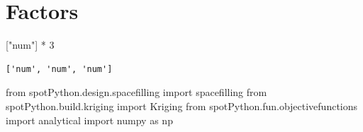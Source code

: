 \documentclass[
  letterpaper,
  DIV=11,
  numbers=noendperiod]{scrreprt}
\newenvironment{Shaded}{\begin{snugshade}}{\end{snugshade}}
\newcommand{\DecValTok}[1]{\textcolor[rgb]{0.68,0.00,0.00}{#1}}
\newcommand{\ImportTok}[1]{\textcolor[rgb]{0.00,0.46,0.62}{#1}}
\newcommand{\NormalTok}[1]{\textcolor[rgb]{0.00,0.23,0.31}{#1}}
\newcommand{\OperatorTok}[1]{\textcolor[rgb]{0.37,0.37,0.37}{#1}}
\newcommand{\StringTok}[1]{\textcolor[rgb]{0.13,0.47,0.30}{#1}}
\begin{document}
\hypertarget{factors}{%
\section{Factors}\label{factors}}

\begin{Shaded}
\begin{Highlighting}[]
\NormalTok{[}\StringTok{"num"}\NormalTok{] }\OperatorTok{*} \DecValTok{3}
\end{Highlighting}
\end{Shaded}

\begin{verbatim}
['num', 'num', 'num']
\end{verbatim}

\begin{Shaded}
\begin{Highlighting}[]
\ImportTok{from}\NormalTok{ spotPython.design.spacefilling }\ImportTok{import}\NormalTok{ spacefilling}
\ImportTok{from}\NormalTok{ spotPython.build.kriging }\ImportTok{import}\NormalTok{ Kriging}
\ImportTok{from}\NormalTok{ spotPython.fun.objectivefunctions }\ImportTok{import}\NormalTok{ analytical}
\ImportTok{import}\NormalTok{ numpy }\ImportTok{as}\NormalTok{ np}
\end{Highlighting}
\end{Shaded}
\end{document}

